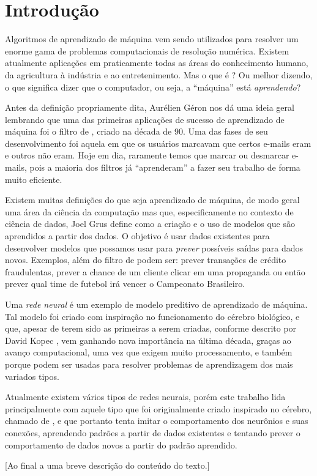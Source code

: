 
\chapter{Introdução}
\label{cap:introducao}


Algoritmos de aprendizado de máquina vem sendo utilizados para resolver um enorme gama de problemas computacionais de resolução numérica. Existem atualmente aplicações em praticamente todas as áreas do conhecimento humano, da agricultura à indústria e ao entretenimento. Mas o que é ? Ou melhor dizendo, o que significa dizer que o computador, ou seja, a ``máquina'' está \emph{aprendendo}? 

Antes da definição propriamente dita, Aurélien Géron \citep{hands} nos dá uma ideia geral lembrando que uma das primeiras aplicações de sucesso de aprendizado de máquina foi o filtro de , criado na década de 90. Uma das fases de seu desenvolvimento foi aquela em que os usuários marcavam que certos e-mails eram  e outros não eram. Hoje em dia, raramente temos que marcar ou desmarcar e-mails, pois a maioria dos filtros já ``aprenderam'' a fazer seu trabalho de forma muito eficiente.

Existem muitas definições do que seja aprendizado de máquina, de modo geral uma área da ciência da computação mas que, especificamente no contexto de ciência de dados, Joel Grus \citep{data} define como a criação e o uso de modelos que são aprendidos a partir dos dados. O objetivo é usar dados existentes para desenvolver modelos que possamos usar para \emph{prever} possíveis saídas para dados novos. Exemplos, além do filtro de  podem ser: prever transações de crédito fraudulentas, prever a chance de um cliente clicar em uma propaganda ou então prever qual time de futebol irá vencer o Campeonato Brasileiro.

Uma \emph{rede neural} é um exemplo de modelo preditivo de aprendizado de máquina. Tal modelo foi criado com inspiração no funcionamento do cérebro biológico, e que, apesar de terem sido as primeiras a serem criadas, conforme descrito por David Kopec \citep{classic}, vem ganhando nova importância na última década, graças ao avanço computacional, uma vez que exigem muito processamento, e também porque podem ser usadas para resolver problemas de aprendizagem dos mais variados tipos.

Atualmente existem vários tipos de redes neurais, porém este trabalho lida principalmente com aquele tipo que foi originalmente criado inspirado no cérebro, chamado de , e que portanto tenta imitar o comportamento dos neurônios e suas conexões, aprendendo padrões a partir de dados existentes e tentando prever o comportamento de dados novos a partir do padrão aprendido.

[Ao final a uma breve descrição do conteúdo do texto.]

